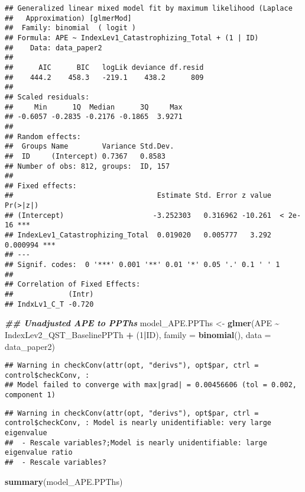 \documentclass[
  12pt,
]{article}
\newenvironment{Shaded}{\begin{snugshade}}{\end{snugshade}}
\newcommand{\AttributeTok}[1]{\textcolor[rgb]{0.13,0.29,0.53}{#1}}
\newcommand{\DecValTok}[1]{\textcolor[rgb]{0.00,0.00,0.81}{#1}}
\newcommand{\DocumentationTok}[1]{\textcolor[rgb]{0.56,0.35,0.01}{\textbf{\textit{#1}}}}
\newcommand{\FunctionTok}[1]{\textcolor[rgb]{0.13,0.29,0.53}{\textbf{#1}}}
\newcommand{\NormalTok}[1]{#1}
\newcommand{\OtherTok}[1]{\textcolor[rgb]{0.56,0.35,0.01}{#1}}
\newcommand{\SpecialCharTok}[1]{\textcolor[rgb]{0.81,0.36,0.00}{\textbf{#1}}}
\begin{document}
\begin{verbatim}
## Generalized linear mixed model fit by maximum likelihood (Laplace
##   Approximation) [glmerMod]
##  Family: binomial  ( logit )
## Formula: APE ~ IndexLev1_Catastrophizing_Total + (1 | ID)
##    Data: data_paper2
## 
##      AIC      BIC   logLik deviance df.resid 
##    444.2    458.3   -219.1    438.2      809 
## 
## Scaled residuals: 
##     Min      1Q  Median      3Q     Max 
## -0.6057 -0.2835 -0.2176 -0.1865  3.9271 
## 
## Random effects:
##  Groups Name        Variance Std.Dev.
##  ID     (Intercept) 0.7367   0.8583  
## Number of obs: 812, groups:  ID, 157
## 
## Fixed effects:
##                                  Estimate Std. Error z value Pr(>|z|)    
## (Intercept)                     -3.252303   0.316962 -10.261  < 2e-16 ***
## IndexLev1_Catastrophizing_Total  0.019020   0.005777   3.292 0.000994 ***
## ---
## Signif. codes:  0 '***' 0.001 '**' 0.01 '*' 0.05 '.' 0.1 ' ' 1
## 
## Correlation of Fixed Effects:
##             (Intr)
## IndxLv1_C_T -0.720
\end{verbatim}

\begin{Shaded}
\begin{Highlighting}[]
\DocumentationTok{\#\# Unadjusted APE to PPThs}
\NormalTok{model\_APE.PPThs }\OtherTok{\textless{}{-}} \FunctionTok{glmer}\NormalTok{(APE }\SpecialCharTok{\textasciitilde{}}\NormalTok{ IndexLev2\_QST\_BaselinePPTh }\SpecialCharTok{+}\NormalTok{ (}\DecValTok{1}\SpecialCharTok{|}\NormalTok{ID), }\AttributeTok{family =} \FunctionTok{binomial}\NormalTok{(), }\AttributeTok{data =}\NormalTok{ data\_paper2)}
\end{Highlighting}
\end{Shaded}

\begin{verbatim}
## Warning in checkConv(attr(opt, "derivs"), opt$par, ctrl = control$checkConv, :
## Model failed to converge with max|grad| = 0.00456606 (tol = 0.002, component 1)
\end{verbatim}

\begin{verbatim}
## Warning in checkConv(attr(opt, "derivs"), opt$par, ctrl = control$checkConv, : Model is nearly unidentifiable: very large eigenvalue
##  - Rescale variables?;Model is nearly unidentifiable: large eigenvalue ratio
##  - Rescale variables?
\end{verbatim}

\begin{Shaded}
\begin{Highlighting}[]
\FunctionTok{summary}\NormalTok{(model\_APE.PPThs)}
\end{Highlighting}
\end{Shaded}
\end{document}
